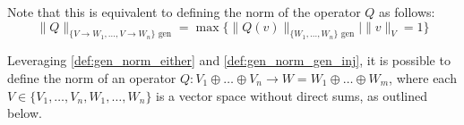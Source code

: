 Note that this is equivalent to defining the norm of the operator $Q$ as follows:
\begin{equation}
  \|Q\|_{\{ V \rightarrow W_1,\ldots ,V \rightarrow W_n\} \text{ gen}} = \max \{ \|Q (v)\|_{\{ W_1,\ldots , W_n\} \text{ gen}}  \mid  \|v\|_{V} = 1 \}
\end{equation}



Leveraging \autoref{def:gen_norm_either} and \autoref{def:gen_norm_gen_inj}, it is possible to define the norm of an operator $Q: V_1 \oplus \ldots \oplus V_n  \rightarrow W = W_1 \oplus \ldots \oplus W_m$, where each $V \in \{V_1, \ldots, V_n, W_1, \ldots, W_n\}$ is a vector space without direct sums, as outlined below.


